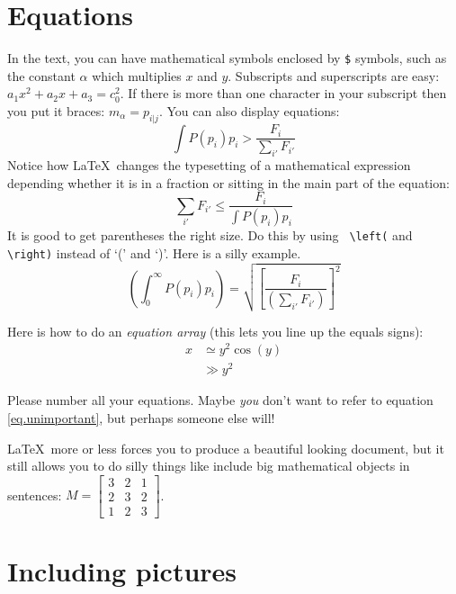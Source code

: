 \documentclass[12pt]{article}
\begin{document}
\section{Equations}
\label{equation_section}

In the text, you can have mathematical symbols enclosed by \verb+$+
symbols, such as the constant $\alpha$ which multiplies $x$ and $y$.
Subscripts and superscripts are easy: $a_1 x^2 + a_2 x + a_3 =
c_0^2$.  If there is more than one character in your subscript then
you put it braces: $m_{\alpha} = p_{i|j}$.  You can also display
equations:
\begin{equation}
	\int   P(p_i) p_i >  \frac{ F_i }{ \sum_{i'} F_{i'} }
	\label{eq2}
\end{equation}
Notice how \LaTeX\ changes the typesetting of a mathematical
expression depending whether it is in a fraction or sitting in the
main part of the equation:
\begin{equation}
	\sum_{i'} F_{i'}  \leq \frac{ F_i }{ \int   P({p_i}) p_i }
	\label{approx}
\end{equation}
It is good to get parentheses the right size. Do this by using {\tt
\verb+\left(+} and {\tt \verb+\right)+} instead of `(' and `)'. Here is a silly
example.
\begin{equation}
\left(	\int_0^{\infty}   P(p_i) p_i  \right)
	=
 \sqrt{ \left[ \frac{ F_i } { \left( \sum_{i'} F_{i'} \right) } \right]^2 }
\label{eq3}
\end{equation}

Here is how to do an \emph{equation array} (this lets you line up the equals signs):
\begin{align}
x & \simeq y^2 \cos(y) \label{eq.unimportant}\\
 & \gg    y^2 	
\label{eq1}
\end{align}

Please number all your equations. Maybe {\em{you}\/} don't want
to refer to equation \ref{eq.unimportant}, but perhaps someone else will!

\LaTeX\ more or less forces you to produce a beautiful looking document, but it still allows you to do silly things like include big mathematical objects in sentences: 
$M = \left[
	\begin{array}{ccc}
		3 & 2 & 1 \\
		2 & 3 & 2 \\
		1 & 2 & 3
	\end{array} 
	\right]
$.

\section{Including pictures}
\end{document}
